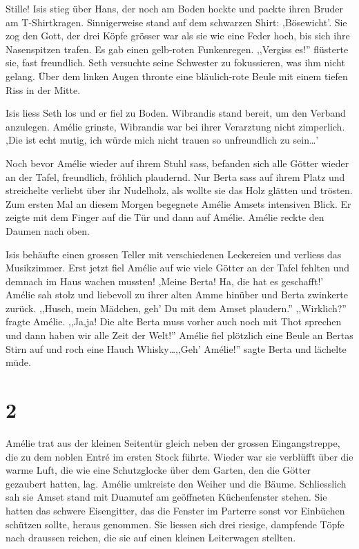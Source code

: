 \documentclass[11pt,titlepage,a5paper]{book}
\begin{document}
Stille! Isis stieg über Hans, der noch am Boden hockte und packte ihren Bruder am T-Shirtkragen. Sinnigerweise stand auf dem schwarzen Shirt: ,Bösewicht'. Sie zog den Gott, der drei Köpfe grösser war als sie wie eine Feder hoch, bis sich ihre Nasenspitzen trafen. Es gab einen gelb-roten Funkenregen. ,,Vergiss es!'' flüsterte sie, fast freundlich. Seth versuchte seine Schwester zu fokussieren, was ihm nicht gelang. Über dem linken Augen thronte eine bläulich-rote Beule mit einem tiefen Riss in der Mitte.

Isis liess Seth los und er fiel zu Boden. Wibrandis stand bereit, um den Verband anzulegen. Amélie grinste, Wibrandis war bei ihrer Verarztung nicht zimperlich. ,Die ist echt mutig, ich würde mich nicht trauen so unfreundlich zu sein\dots'

Noch bevor Amélie wieder auf ihrem Stuhl sass, befanden sich alle Götter wieder an der Tafel, freundlich, fröhlich plaudernd. Nur Berta sass auf ihrem Platz und streichelte verliebt über ihr Nudelholz, als wollte sie das Holz glätten und trösten. Zum ersten Mal an diesem Morgen begegnete Amélie Amsets intensiven Blick. Er zeigte mit dem Finger auf die Tür und dann auf Amélie. Amélie reckte den Daumen nach oben. 

Isis behäufte einen grossen Teller mit verschiedenen Leckereien und verliess das Musikzimmer. Erst jetzt fiel Amélie auf wie viele Götter an der Tafel fehlten und demnach im Haus wachen mussten! ,Meine Berta! Ha, die hat es geschafft!' Amélie sah stolz und liebevoll zu ihrer alten Amme hinüber und Berta zwinkerte zurück. ,,Husch, mein Mädchen, geh' Du mit dem Amset plaudern.'' ,,Wirklich?'' fragte Amélie. ,,Ja,ja! Die alte Berta muss vorher auch noch mit Thot sprechen und dann haben wir alle Zeit der Welt!''  Amélie fiel plötzlich eine Beule an Bertas Stirn auf und roch eine Hauch Whisky\dots ,,Geh' Amélie!'' sagte Berta und lächelte müde.

\section*{2}

Amélie trat aus der kleinen Seitentür gleich neben der grossen Eingangstreppe, die zu dem noblen Entré im ersten Stock führte. Wieder war sie verblüfft über die warme Luft, die wie eine Schutzglocke über dem Garten, den die Götter gezaubert hatten, lag. Amélie umkreiste den Weiher und die Bäume. Schliesslich sah sie Amset stand mit Duamutef am geöffneten Küchenfenster stehen. Sie hatten das schwere Eisengitter, das die Fenster im Parterre sonst vor Einbüchen schützen sollte, heraus genommen. Sie liessen sich drei riesige, dampfende Töpfe nach draussen reichen, die sie auf einen kleinen Leiterwagen stellten.
\end{document}
